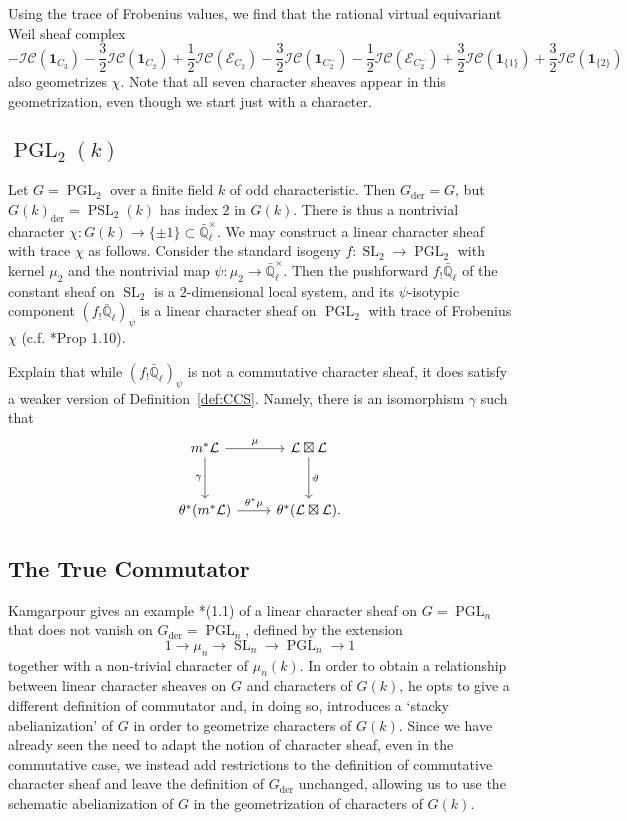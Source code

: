 \documentclass[10pt]{amsart}
\theoremstyle{plain}
\theoremstyle{definition}
\newcommand{\EE}{\mathbb{\bar Q}_\ell}
\newcommand{\Fq}{k}
\newcommand{\EEx}{\EE^\times}
\DeclareMathOperator{\SL}{SL}
\DeclareMathOperator{\PGL}{PGL}
\DeclareMathOperator{\PSL}{PSL}
\newcommand{\der}{_{\operatorname{der}}}
\newcommand{\cs}[1]{{\mathcal{#1}}}
\newcommand{\IC}{\mathcal{IC}}
\begin{document}
\vspace{0.1in}
\noindent Using the trace of Frobenius values, we find that the rational virtual equivariant Weil sheaf complex
\[
- \IC(\mathbf{1}_{C_3}) - \frac32 \IC(\mathbf{1}_{C_2}) + \frac12 \IC(\cs{E}_{C_2}) - \frac32 \IC(\mathbf{1}_{C_2^-}) - \frac12 \IC(\cs{E}_{C_2^-}) + \frac32 \IC(\mathbf{1}_{\{1\}}) + \frac32 \IC(\mathbf{1}_{\{2\}})
\]
also geometrizes $\chi$.  Note that all seven character sheaves appear in this geometrization, even though we start just with a character.

\subsection{\texorpdfstring{$\PGL_2(k)$}{PGL(2, k)}}

Let $G = \PGL_2$ over a finite field $k$ of odd characteristic.  Then $G\der = G$, but $G(k)\der = \PSL_2(k)$ has index $2$ in $G(k)$.  There is thus a nontrivial character $\chi : G(k) \to \{\pm 1\} \subset \EEx$.  We may construct a linear character sheaf with trace $\chi$ as follows.  Consider the standard isogeny $f : \SL_2 \to \PGL_2$ with kernel $\mu_2$ and the nontrivial map $\psi : \mu_2 \to \EEx$.  Then the pushforward $f_! \EE$ of the constant sheaf on $\SL_2$ is a $2$-dimensional local system, and its $\psi$-isotypic component $(f_! \EE)_\psi$ is a linear character sheaf on $\PGL_2$ with trace of Frobenius $\chi$ (c.f. \cite{cunningham-roe:13a}*{Prop 1.10}).

\todo{}
Explain that while $(f_! \EE)_\psi$ is not a commutative character sheaf, it does satisfy a weaker version of Definition~\ref{def:CCS}. Namely, there is an isomorphism $\gamma$ such that
 \[
  \begin{tikzcd}[row sep=30]
   m^*\cs{L} \arrow{d}[swap]{\gamma} \arrow{r}{\mu} & \cs{L}\boxtimes\cs{L} \arrow{d}{\vartheta}\\
   \theta^*(m^*\cs{L}) \arrow{r}{{\theta}^*\mu} &  \theta^*(\cs{L}\boxtimes\cs{L}).
  \end{tikzcd}
  \]


\subsection{The True Commutator}


Kamgarpour gives an example \cite{kamgarpour:09a}*{(1.1)} of a linear character sheaf
on $G = \PGL_n$ that does not vanish on $G\der = \PGL_n$, defined by the extension
\[
1 \to \mu_n \to \SL_n \to \PGL_n \to 1
\]
together with a non-trivial character of $\mu_n(k)$. 
In order to obtain a relationship between linear character sheaves on $G$ and characters of $G(k)$,
he opts to give a different definition of commutator and, in doing so, introduces a `stacky abelianization' of $G$ in order to geometrize characters of $G(\Fq)$.
 Since we have already seen the need to adapt the
notion of character sheaf, even in the commutative case, we instead add restrictions
to the definition of commutative character sheaf and leave the definition of $G\der$ unchanged, allowing us to use the schematic abelianization of $G$ in the geometrization of characters of $G(\Fq)$.
\end{document}
